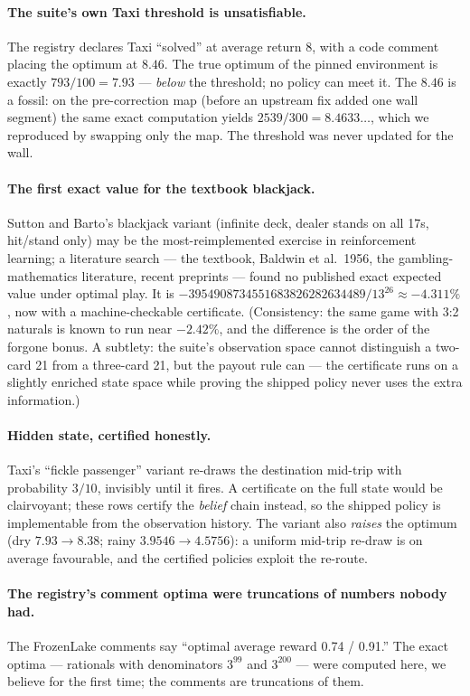 \paragraph{The suite's own Taxi threshold is unsatisfiable.} The
registry declares Taxi ``solved'' at average return $8$, with a code
comment placing the optimum at $8.46$. The true optimum of the pinned
environment is exactly $793/100 = 7.93$ --- \emph{below} the
threshold; no policy can meet it. The $8.46$ is a fossil: on the
pre-correction map (before an upstream fix added one wall segment) the
same exact computation yields $2539/300 = 8.4633\ldots$, which we
reproduced by swapping only the map. The threshold was never updated
for the wall.

\paragraph{The first exact value for the textbook blackjack.} Sutton
and Barto's blackjack variant (infinite deck, dealer stands on all
17s, hit/stand only) may be the most-reimplemented exercise in
reinforcement learning; a literature search --- the textbook, Baldwin
et al.\ 1956, the gambling-mathematics literature, recent preprints
--- found no published exact expected value under optimal play. It is
$-3954908734551683826282634489 / 13^{26} \approx -4.311\%$, now with
a machine-checkable certificate. (Consistency: the same game with 3:2
naturals is known to run near $-2.42\%$, and the difference is the
order of the forgone bonus. A subtlety: the suite's observation space
cannot distinguish a two-card 21 from a three-card 21, but the payout
rule can --- the certificate runs on a slightly enriched state space
while proving the shipped policy never uses the extra information.)

\paragraph{Hidden state, certified honestly.} Taxi's ``fickle
passenger'' variant re-draws the destination mid-trip with probability
$3/10$, invisibly until it fires. A certificate on the full state
would be clairvoyant; these rows certify the \emph{belief} chain
instead, so the shipped policy is implementable from the observation
history. The variant also \emph{raises} the optimum (dry
$7.93 \to 8.38$; rainy $3.9546 \to 4.5756$): a uniform mid-trip
re-draw is on average favourable, and the certified policies exploit
the re-route.

\paragraph{The registry's comment optima were truncations of numbers
nobody had.} The FrozenLake comments say ``optimal average reward
0.74 / 0.91.'' The exact optima --- rationals with denominators
$3^{99}$ and $3^{200}$ --- were computed here, we believe for the
first time; the comments are truncations of them.

